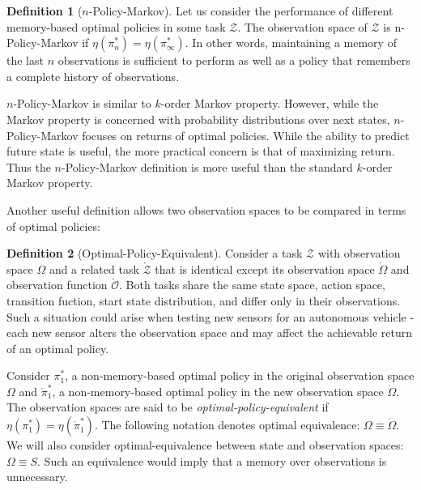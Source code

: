 \documentclass{article} %
\theoremstyle{definition}
\newtheorem{definition}{Definition}[section]
\begin{document}
\begin{definition}[$n$-Policy-Markov]
Let us consider the performance of different memory-based optimal
policies in some task $\mathcal{Z}$. The observation space of
$\mathcal{Z}$ is n-Policy-Markov if $\eta(\pi^*_n) =
\eta(\pi^*_\infty)$. In other words, maintaining a memory of the last
$n$ observations is sufficient to perform as well as a policy that
remembers a complete history of observations.

$n$-Policy-Markov is similar to $k$-order Markov property. However,
while the Markov property is concerned with probability distributions
over next states, $n$-Policy-Markov focuses on returns of optimal
policies. While the ability to predict future state is useful, the
more practical concern is that of maximizing return. Thus the
$n$-Policy-Markov definition is more useful than the standard
$k$-order Markov property.
\end{definition}

Another useful definition allows two observation spaces to be compared
in terms of optimal policies:

\begin{definition}[Optimal-Policy-Equivalent]
\label{def:opt-equiv}
Consider a task $\mathcal{Z}$ with observation space $\Omega$ and a
related task $\mathring{\mathcal{Z}}$ that is identical except its
observation space $\mathring{\Omega}$ and observation function
$\mathring{\mathcal{O}}$. Both tasks share the same state space,
action space, transition fuction, start state distribution, and differ
only in their observations. Such a situation could arise when testing
new sensors for an autonomous vehicle - each new sensor alters the
observation space and may affect the achievable return of an optimal
policy.

Consider $\pi^*_1$, a non-memory-based optimal policy in the original
observation space $\Omega$ and $\mathring{\pi}^*_1$, a
non-memory-based optimal policy in the new observation space
$\mathring{\Omega}$. The observation spaces are said to be
\textit{optimal-policy-equivalent} if $\eta (\pi^*_1) = \eta
(\mathring{\pi}^*_1)$. The following notation denotes optimal
equivalence: $\Omega \equiv \mathring{\Omega}$. We will also consider
optimal-equivalence between state and observation spaces: $\Omega
\equiv S$. Such an equivalence would imply that a memory over
observations is unnecessary.
\end{definition}
\end{document}
